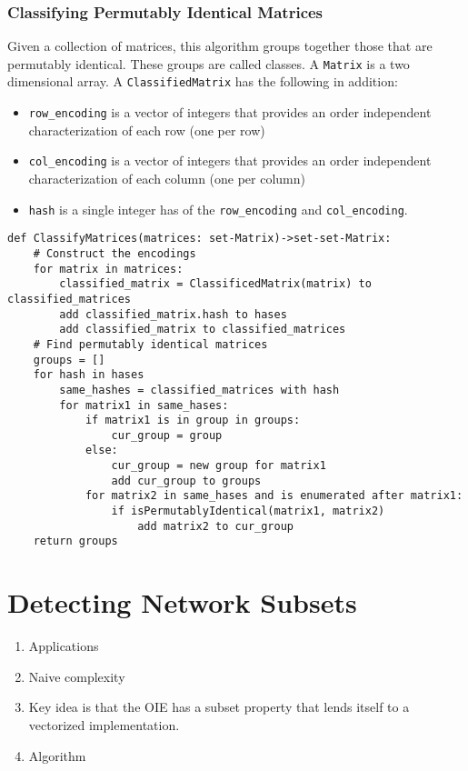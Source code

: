 \documentclass{article}
\begin{document}
\subsubsection{Classifying Permutably Identical Matrices}
Given a collection of matrices, this algorithm groups together those that are permutably identical. These groups are called classes. A {\tt Matrix} is a two dimensional array.
A {\tt ClassifiedMatrix} has the following in addition:
\begin{itemize}
    \item {\tt row\_encoding} is a vector of integers that provides an order independent characterization of each row (one per row)
    \item {\tt col\_encoding} is a vector of integers that provides an order independent characterization of each column (one per column)
    \item {\tt hash} is a single integer has of the {\tt row\_encoding} and {\tt col\_encoding}.
\end{itemize}
\begin{lstlisting}
def ClassifyMatrices(matrices: set-Matrix)->set-set-Matrix:
    # Construct the encodings
    for matrix in matrices:
        classified_matrix = ClassificedMatrix(matrix) to classified_matrices
        add classified_matrix.hash to hases
        add classified_matrix to classified_matrices
    # Find permutably identical matrices
    groups = []
    for hash in hases
        same_hashes = classified_matrices with hash
        for matrix1 in same_hases:
            if matrix1 is in group in groups:
                cur_group = group
            else:
                cur_group = new group for matrix1
                add cur_group to groups
            for matrix2 in same_hases and is enumerated after matrix1:
                if isPermutablyIdentical(matrix1, matrix2)
                    add matrix2 to cur_group
    return groups
\end{lstlisting}

\section{Detecting Network Subsets}
\begin{enumerate}
    \item Applications
    \item Naive complexity
    \item Key idea is that the OIE has a subset property that lends itself to a vectorized implementation.
    \item Algorithm
\end{enumerate}
\end{document}
